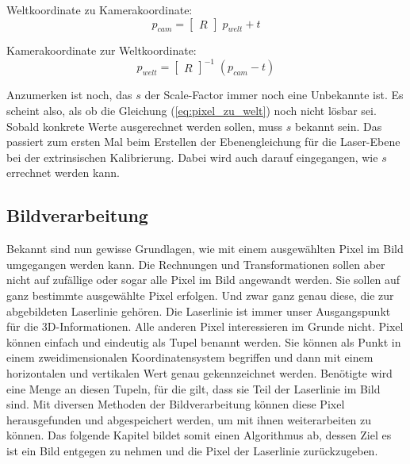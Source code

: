 	Weltkoordinate zu Kamerakoordinate:
	\begin{equation}
	p_{cam} = \begin{bmatrix} R \end{bmatrix} \; p_{welt} + t
	\label{eq:welt_zu_kamera}
	\end{equation}
	
	Kamerakoordinate zur Weltkoordinate:
	\begin{equation}
	p_{welt} = \begin{bmatrix} R \end{bmatrix}^{-1} \; (p_{cam} - t)
	\label{eq:kamera_zu_welt}
	\end{equation}
	
	Anzumerken ist noch, das \( s \) der Scale-Factor immer noch eine Unbekannte ist. Es scheint also, als ob die Gleichung (\ref{eq:pixel_zu_welt}) noch nicht lösbar sei. Sobald konkrete Werte ausgerechnet werden sollen, muss \( s \) bekannt sein. Das passiert zum ersten Mal beim Erstellen der Ebenengleichung für die Laser-Ebene bei der extrinsischen Kalibrierung. Dabei wird auch darauf eingegangen, wie \( s \) errechnet werden kann.  
	
	\newpage
	
	\label{chap:transformationen}
	\subsection{Bildverarbeitung}
	Bekannt sind nun gewisse Grundlagen, wie mit einem ausgewählten Pixel im Bild umgegangen werden kann. Die Rechnungen und Transformationen sollen aber nicht auf zufällige oder sogar alle Pixel im Bild angewandt werden. Sie sollen auf ganz bestimmte ausgewählte Pixel erfolgen. Und zwar ganz genau diese, die zur abgebildeten Laserlinie gehören. Die Laserlinie ist immer unser Ausgangspunkt für die 3D-Informationen. Alle anderen Pixel interessieren im Grunde nicht. \newline
	Pixel können einfach und eindeutig als Tupel benannt werden. Sie können als Punkt in einem zweidimensionalen Koordinatensystem begriffen und dann mit einem horizontalen und vertikalen Wert genau gekennzeichnet werden. Benötigte wird eine Menge an diesen Tupeln, für die gilt, dass sie Teil der Laserlinie im Bild sind. Mit diversen Methoden der Bildverarbeitung können diese Pixel herausgefunden und abgespeichert werden, um mit ihnen weiterarbeiten zu können. Das folgende Kapitel bildet somit einen Algorithmus ab, dessen Ziel es ist ein Bild entgegen zu nehmen und die Pixel der Laserlinie zurückzugeben. 
	
